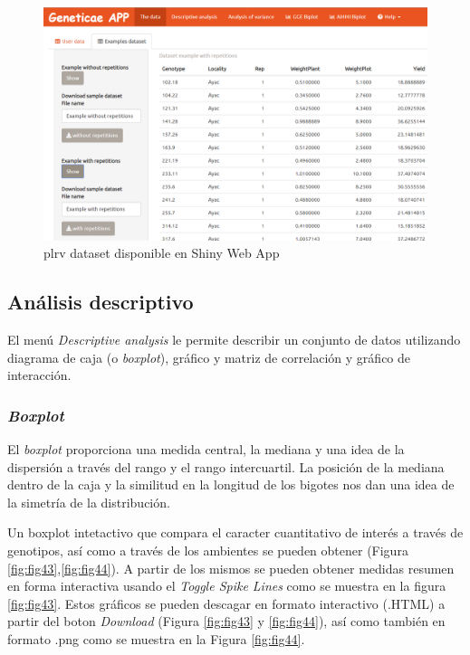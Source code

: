 \begin{figure}[H]
	\begin{center}
		\includegraphics[width=16cm]{./Graficos/Exampledatasets_withrep.png}
	\end{center}
	\caption{plrv dataset disponible en Shiny Web App}
	\label{fig:fig42}
\end{figure}

\subsection{Análisis descriptivo}

El menú \emph{Descriptive analysis} le permite describir un conjunto de datos utilizando diagrama de caja (o \emph{boxplot}), gráfico y matriz de correlación y gráfico de interacción.

\subsubsection{\emph{Boxplot}}
El \emph{boxplot} proporciona una medida central, la mediana y una idea de la dispersión a través del rango y el rango intercuartil. La posición de la mediana dentro de la caja y la similitud en la longitud de los bigotes nos dan una idea de la simetría de la distribución. 

Un boxplot intetactivo que compara el caracter cuantitativo de interés a través de genotipos, así como a través de los ambientes se pueden obtener (Figura \ref{fig:fig43},\ref{fig:fig44}). A partir de los mismos se pueden obtener medidas resumen en forma interactiva usando el \emph{Toggle Spike Lines} como se muestra en la figura \ref{fig:fig43}. Estos gráficos se pueden descagar en formato interactivo (.HTML) a partir del boton \emph{Download} (Figura \ref{fig:fig43} y \ref{fig:fig44}), así como también en formato .png como se muestra en la Figura \ref{fig:fig44}.

